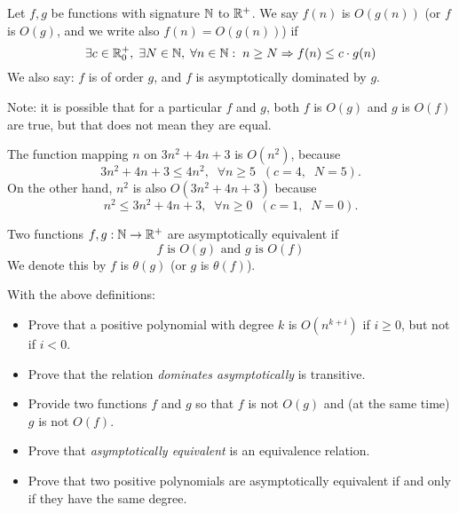 \begin{definition}
Let $f,g$ be functions with signature $\mathbb{N}$ to $\mathbb{R}^+$. We say
$f(n)$ is $O(g(n))$ (or $f$ is $O(g)$, and we write also
  $f(n)=O(g(n))$) if
\begin{equation*}
	\exists c\in \mathbb{R}_0^+,\; \exists N\in \mathbb{N},\;
\forall n\in \mathbb{N}: \; n\geq N \Rightarrow f(n)\leq c \cdot g(n)
\end{equation*}
We also say: $f$ is of order $g$, and $f$ is asymptotically dominated by
$g$.
\end{definition}

Note: it is possible that for a particular $f$ and $g$, both $f$ is
$O(g)$ and $g$ is $O(f)$ are true, but that does not mean they are
equal.

\begin{example}
The function mapping $n$ on $3n^2+4n +3$ is $O(n^2)$, because
\[ 3 n^2+4n +3 \leq 4 n^2,\;\; \forall n\geq 5 \;\;(c=4,\;\;N=5).\]
On the other hand, $n^2$ is also $O(3n^2+4n +3)$ because
\[ n^2 \leq 3 n^2+4n+3,\;\; \forall n\geq 0 \;\; (c=1,\;\; N=0). \]
\end{example}

\begin{definition}
Two functions $f,g:\mathbb{N}\rightarrow \mathbb{R}^+$ are asymptotically equivalent
  if
\begin{equation*}
	f\mbox{ is }O(g)\mbox{ and } g \mbox{ is } O(f)
\end{equation*}
We denote this by $f$ is $\theta(g)$ (or $g$ is $\theta(f)$).
\end{definition}

\begin{exercise}
With the above definitions:
\begin{itemize}
\item Prove that a positive polynomial with degree $k$ is
$O(n^{k+i})$ if $i \geq 0$, but not if $i < 0$.

\item Prove that the relation {\em dominates asymptotically} is transitive.

\item Provide two functions $f$ and $g$ so that $f$ is not $O(g)$ and (at the same time)
$g$ is not $O(f)$.

\item Prove that {\em asymptotically equivalent} is an equivalence
relation.

\item Prove that two positive polynomials are asymptotically equivalent if
and only if they have the same degree.
\end{itemize}
\end{exercise}

